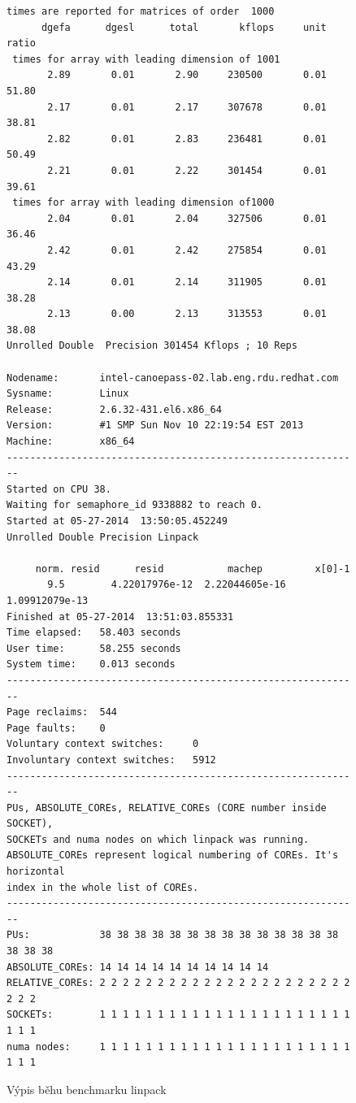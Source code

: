 \documentclass[
  master=true,
  font=sans,
  printversion=false,
  joinlists=true,
  figures=true,
  tables=true,
  sourcecodes=false,
  theorems=false,
  bibencoding=utf8,
  language=czech,
  encoding=utf8,
  field=ainfk,
  biblatex,
  glossaries,
  index
]{kidiplom}
\begin{document}
\begin{figure}[ht]
\caption{Výpis běhu benchmarku linpack}
\center
\label{linpack1}
\fontsize{6.8pt}{8.5pt}\selectfont
\begin{Verbatim}[frame=single]
    times are reported for matrices of order  1000
      dgefa      dgesl      total       kflops     unit      ratio
 times for array with leading dimension of 1001
       2.89       0.01       2.90     230500       0.01      51.80
       2.17       0.01       2.17     307678       0.01      38.81
       2.82       0.01       2.83     236481       0.01      50.49
       2.21       0.01       2.22     301454       0.01      39.61
 times for array with leading dimension of1000
       2.04       0.01       2.04     327506       0.01      36.46
       2.42       0.01       2.42     275854       0.01      43.29
       2.14       0.01       2.14     311905       0.01      38.28
       2.13       0.00       2.13     313553       0.01      38.08
Unrolled Double  Precision 301454 Kflops ; 10 Reps 

Nodename:       intel-canoepass-02.lab.eng.rdu.redhat.com
Sysname:        Linux
Release:        2.6.32-431.el6.x86_64
Version:        #1 SMP Sun Nov 10 22:19:54 EST 2013
Machine:        x86_64
-------------------------------------------------------------
Started on CPU 38.
Waiting for semaphore_id 9338882 to reach 0.
Started at 05-27-2014  13:50:05.452249
Unrolled Double Precision Linpack

     norm. resid      resid           machep         x[0]-1     
       9.5        4.22017976e-12  2.22044605e-16  1.09912079e-13
Finished at 05-27-2014  13:51:03.855331
Time elapsed:   58.403 seconds
User time:      58.255 seconds
System time:    0.013 seconds
-------------------------------------------------------------
Page reclaims:  544
Page faults:    0
Voluntary context switches:     0
Involuntary context switches:   5912
-------------------------------------------------------------
PUs, ABSOLUTE_COREs, RELATIVE_COREs (CORE number inside SOCKET), 
SOCKETs and numa nodes on which linpack was running.
ABSOLUTE_COREs represent logical numbering of COREs. It's horizontal
index in the whole list of COREs.
-------------------------------------------------------------
PUs:            38 38 38 38 38 38 38 38 38 38 38 38 38 38 38 38 38 
ABSOLUTE_COREs: 14 14 14 14 14 14 14 14 14 14 
RELATIVE_COREs: 2 2 2 2 2 2 2 2 2 2 2 2 2 2 2 2 2 2 2 2 2 2 2 2 2 
SOCKETs:        1 1 1 1 1 1 1 1 1 1 1 1 1 1 1 1 1 1 1 1 1 1 1 1 1 
numa nodes:     1 1 1 1 1 1 1 1 1 1 1 1 1 1 1 1 1 1 1 1 1 1 1 1 1 

\end{Verbatim}
\end{figure}
\end{document}
